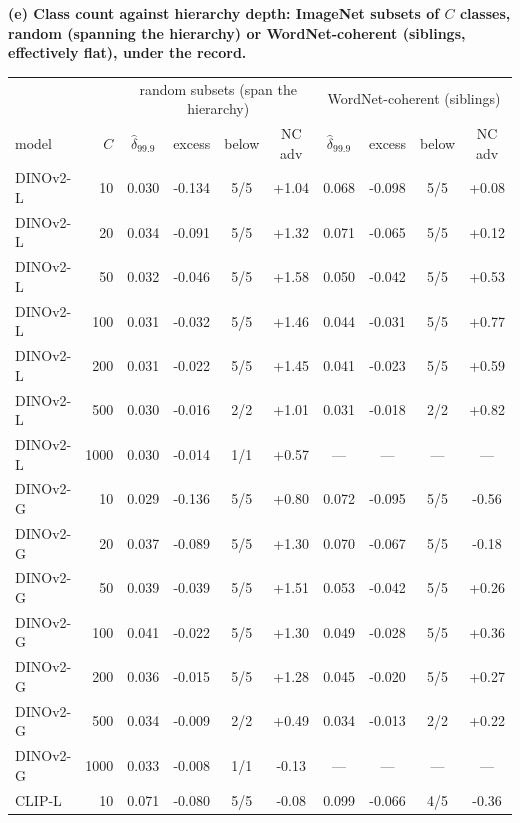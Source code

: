 \begin{table}[H]\ContinuedFloat
\centering
\scriptsize
\setlength{\tabcolsep}{2.4pt}
\begingroup
\noindent\textbf{(e) Class count against hierarchy depth: ImageNet subsets of $C$ classes, random (spanning the hierarchy) or WordNet-coherent (siblings, effectively flat), under the record.}\par\vspace{1.5pt}
\footnotesize
\setlength{\tabcolsep}{3.5pt}
\begin{tabular}{lr|cccc|cccc}
\toprule
 & & \multicolumn{4}{c|}{random subsets (span the hierarchy)} & \multicolumn{4}{c}{WordNet-coherent (siblings)} \\
model & $C$ & $\hat\delta_{99.9}$ & excess & below & NC adv & $\hat\delta_{99.9}$ & excess & below & NC adv \\
\midrule
DINOv2-L & 10 & 0.030 & -0.134 & 5/5 & +1.04 & 0.068 & -0.098 & 5/5 & +0.08 \\
DINOv2-L & 20 & 0.034 & -0.091 & 5/5 & +1.32 & 0.071 & -0.065 & 5/5 & +0.12 \\
DINOv2-L & 50 & 0.032 & -0.046 & 5/5 & +1.58 & 0.050 & -0.042 & 5/5 & +0.53 \\
DINOv2-L & 100 & 0.031 & -0.032 & 5/5 & +1.46 & 0.044 & -0.031 & 5/5 & +0.77 \\
DINOv2-L & 200 & 0.031 & -0.022 & 5/5 & +1.45 & 0.041 & -0.023 & 5/5 & +0.59 \\
DINOv2-L & 500 & 0.030 & -0.016 & 2/2 & +1.01 & 0.031 & -0.018 & 2/2 & +0.82 \\
DINOv2-L & 1000 & 0.030 & -0.014 & 1/1 & +0.57 & --- & --- & --- & --- \\
\midrule
DINOv2-G & 10 & 0.029 & -0.136 & 5/5 & +0.80 & 0.072 & -0.095 & 5/5 & -0.56 \\
DINOv2-G & 20 & 0.037 & -0.089 & 5/5 & +1.30 & 0.070 & -0.067 & 5/5 & -0.18 \\
DINOv2-G & 50 & 0.039 & -0.039 & 5/5 & +1.51 & 0.053 & -0.042 & 5/5 & +0.26 \\
DINOv2-G & 100 & 0.041 & -0.022 & 5/5 & +1.30 & 0.049 & -0.028 & 5/5 & +0.36 \\
DINOv2-G & 200 & 0.036 & -0.015 & 5/5 & +1.28 & 0.045 & -0.020 & 5/5 & +0.27 \\
DINOv2-G & 500 & 0.034 & -0.009 & 2/2 & +0.49 & 0.034 & -0.013 & 2/2 & +0.22 \\
DINOv2-G & 1000 & 0.033 & -0.008 & 1/1 & -0.13 & --- & --- & --- & --- \\
\midrule
CLIP-L & 10 & 0.071 & -0.080 & 5/5 & -0.08 & 0.099 & -0.066 & 4/5 & -0.36 \\

\end{tabular}
\end{table}
